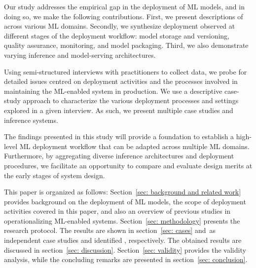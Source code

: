 
Our study addresses the empirical gap in the deployment of ML models, and in doing so, we make the following contributions. First, we present descriptions of \DIFdelbegin {}\DIFdelend \DIFaddbegin {}\DIFaddend across various ML domains. Secondly, we synthesize deployment \DIFdelbegin {}\DIFdelend \DIFaddbegin {}\DIFaddend observed at different stages of the deployment workflow: model storage and versioning, quality assurance, monitoring, and model packaging. Third, we also demonstrate varying inference and model-serving architectures.
\DIFdelbegin %

\DIFdelend %
Using semi-structured interviews with practitioners to collect data, we probe for detailed issues centred on deployment activities and the processes involved in maintaining the ML-enabled system in production. We use a descriptive case-study approach to characterize the various deployment processes and settings explored in a given interview. As such, we present multiple case studies and inference systems.

The findings presented in this study will provide a foundation to establish a high-level ML deployment workflow that can be adapted across multiple ML domains. Furthermore, by aggregating diverse inference architectures and deployment procedures, we facilitate an opportunity to compare and evaluate design merits at the early stages of system design. %

This paper is organized as follows: Section~\ref{sec: background and related work} provides background on the deployment of ML models, the scope of deployment activities covered in this paper, and also an overview of previous studies in operationalizing ML-enabled systems. Section~\ref{sec: methodology} presents the research protocol. The results are shown in section~\ref{sec: cases} and~\DIFdelbegin \DIFdel{\ref{sec: patterns} }\DIFdelend \DIFaddbegin \DIFadd{\ref{sec: recurrent_themes} }\DIFaddend as independent case studies and identified \DIFdelbegin {}\DIFdelend \DIFaddbegin {}\DIFaddend , respectively. The obtained results are discussed in section~\ref{sec: discussion}. Section~\ref{sec: validity} provides the validity analysis, while the concluding remarks are presented in section~\ref{sec: conclusion}.

